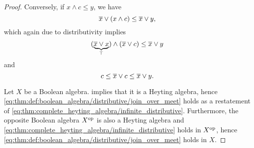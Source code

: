 \begin{proof}
  Conversely, if \( x \wedge c \leq y \), we have
  \begin{equation*}
    \oline x \vee (x \wedge c) \leq \oline x \vee y,
  \end{equation*}
  which again due to distributivity implies
  \begin{equation*}
    (\underbrace{\oline x \vee x}_{\top}) \wedge (\oline x \vee c) \leq \oline x \vee y
  \end{equation*}
  and
  \begin{equation*}
    c \leq \oline x \vee c \leq \oline x \vee y.
  \end{equation*}

   Let \( X \) be a Boolean algebra.  implies that it is a Heyting algebra, hence \eqref{eq:thm:def:boolean_algebra/distributive/join_over_meet} holds as a restatement of \eqref{eq:thm:complete_heyting_algebra/infinite_distributive}. Furthermore, the opposite Boolean algebra \( X^{\operatorname{op}} \) is also a Heyting algebra and \eqref{eq:thm:complete_heyting_algebra/infinite_distributive} holds in \( X^{\operatorname{op}} \), hence \eqref{eq:thm:def:boolean_algebra/distributive/join_over_meet} holds in \( X \).
\end{proof}

